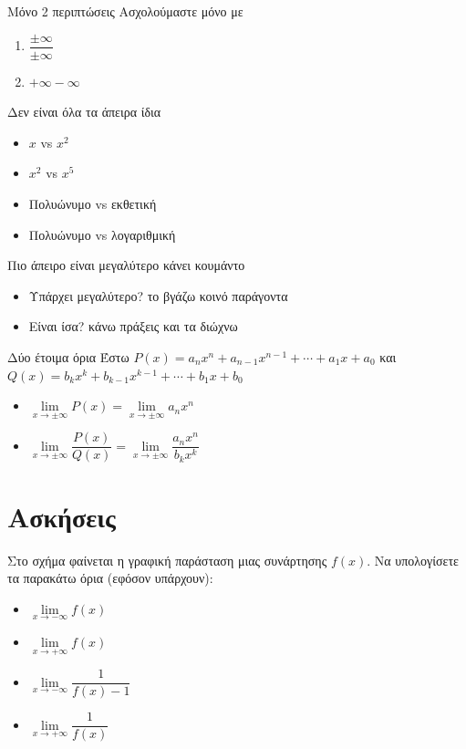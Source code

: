 \documentclass{presentation}
\begin{document}
\begin{frame}{Μόνο 2 περιπτώσεις}
  Ασχολούμαστε μόνο με
  \begin{enumerate}
    \item $\dfrac{\pm\infty}{\pm\infty}$
    \item $+\infty-\infty$
  \end{enumerate}
\end{frame}

\begin{frame}{Δεν είναι όλα τα άπειρα ίδια}
  \begin{itemize}
    \item $x$ vs $x^2$ \pause
    \item $x^2$ vs $x^5$ \pause
    \item Πολυώνυμο vs εκθετική \pause
    \item Πολυώνυμο vs λογαριθμική
  \end{itemize}
\end{frame}

\begin{frame}{Πιο άπειρο είναι μεγαλύτερο κάνει κουμάντο}
  \begin{itemize}
    \item Υπάρχει μεγαλύτερο? το βγάζω κοινό παράγοντα
    \item Είναι ίσα? κάνω πράξεις και τα διώχνω
  \end{itemize}
\end{frame}

\begin{frame}{Δύο έτοιμα όρια}
  Έστω $P(x)=a_nx^n+a_{n-1}x^{n-1}+\cdots +a_1x+a_0$ και $Q(x)=b_kx^k+b_{k-1}x^{k-1}+\cdots +b_1x+b_0$
  \begin{itemize}
    \item $\lim\limits_{x \to \pm\infty}{ P(x) }=\lim\limits_{x \to \pm\infty}{ a_nx^n }$
    \item $\lim\limits_{x \to \pm\infty}{ \dfrac{P(x)}{Q(x)} }=\lim\limits_{x \to \pm\infty}{ \dfrac{a_nx^n}{b_kx^k} }$
  \end{itemize}
\end{frame}

\section{Ασκήσεις}
\begin{askisi}
  Στο σχήμα
  \href{https://www.geogebra.org/m/p9xmedm8}{}
  φαίνεται η γραφική παράσταση μιας συνάρτησης $f(x)$. Να υπολογίσετε τα παρακάτω όρια (εφόσον υπάρχουν):
  \begin{itemize}
    \item $\lim\limits_{x \to -\infty}{ f(x) }$ \pause
    \item $\lim\limits_{x \to +\infty}{ f(x) }$ \pause
    \item $\lim\limits_{x \to -\infty}{ \dfrac{1}{f(x)-1} }$ \pause
    \item $\lim\limits_{x \to +\infty}{ \dfrac{1}{f(x)} }$
  \end{itemize}
\end{askisi}
\end{document}
